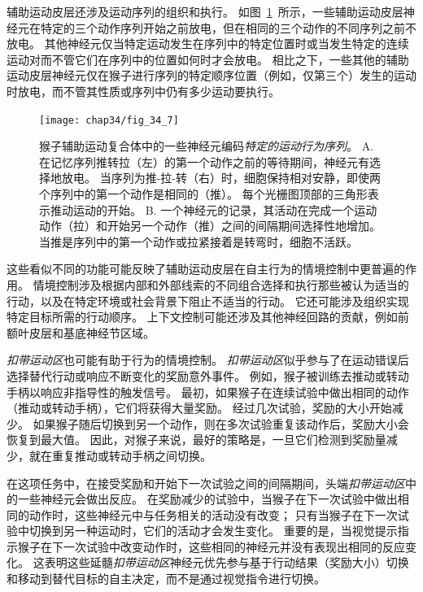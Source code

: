 辅助运动皮层还涉及运动序列的组织和执行。
如图~\ref{fig:34_7}~所示，一些辅助运动皮层神经元在特定的三个动作序列开始之前放电，但在相同的三个动作的不同序列之前不放电。
其他神经元仅当特定运动发生在序列中的特定位置时或当发生特定的连续运动对而不管它们在序列中的位置如何时才会放电。
相比之下，一些其他的辅助运动皮层神经元仅在猴子进行序列的特定顺序位置（例如，仅第三个）发生的运动时放电，而不管其性质或序列中仍有多少运动要执行。


\begin{figure}[htbp]
	\centering
	\texttt{[image: chap34/fig\_34\_7]}
	\caption{猴子辅助运动复合体中的一些神经元编码\textit{特定的运动行为序列}\cite{tanji2001sequential}。
		A. 在记忆序列推转拉（左）的第一个动作之前的等待期间，神经元有选择地放电。
		当序列为推-拉-转（右）时，细胞保持相对安静，即使两个序列中的第一个动作是相同的（推）。
		每个光栅图顶部的三角形表示推动运动的开始。
		B. 一个神经元的记录，其活动在完成一个运动动作（拉）和开始另一个动作（推）之间的间隔期间选择性地增加。
		当推是序列中的第一个动作或拉紧接着是转弯时，细胞不活跃。}
	\label{fig:34_7}
\end{figure}


这些看似不同的功能可能反映了辅助运动皮层在自主行为的情境控制中更普遍的作用。
情境控制涉及根据内部和外部线索的不同组合选择和执行那些被认为适当的行动，以及在特定环境或社会背景下阻止不适当的行动。
它还可能涉及组织实现特定目标所需的行动顺序。
上下文控制可能还涉及其他神经回路的贡献，例如前额叶皮层和基底神经节区域。


\textit{扣带运动区}也可能有助于行为的情境控制。
\textit{扣带运动区}似乎参与了在运动错误后选择替代行动或响应不断变化的奖励意外事件。
例如，猴子被训练去推动或转动手柄以响应非指导性的触发信号。
最初，如果猴子在连续试验中做出相同的动作（推动或转动手柄），它们将获得大量奖励。
经过几次试验，奖励的大小开始减少。
如果猴子随后切换到另一个动作，则在多次试验重复该动作后，奖励大小会恢复到最大值。
因此，对猴子来说，最好的策略是，一旦它们检测到奖励量减少，就在重复推动或转动手柄之间切换。


在这项任务中，在接受奖励和开始下一次试验之间的间隔期间，头端\textit{扣带运动区}中的一些神经元会做出反应。
在奖励减少的试验中，当猴子在下一次试验中做出相同的动作时，这些神经元中与任务相关的活动没有改变；
只有当猴子在下一次试验中切换到另一种运动时，它们的活动才会发生变化。
重要的是，当视觉提示指示猴子在下一次试验中改变动作时，这些相同的神经元并没有表现出相同的反应变化。
这表明这些延髓\textit{扣带运动区}神经元优先参与基于行动结果（奖励大小）切换和移动到替代目标的自主决定，而不是通过视觉指令进行切换。



